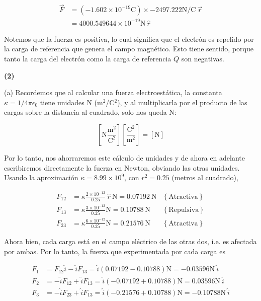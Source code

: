 \documentclass[12pt]{article}
\theoremstyle{definition}
\begin{document}
\begin{align*}
    \vec{F} 
    &= \left( -1.602 \times 10^{-19} \text{C} \right) \times -2497.222
    \text{N/C} ~ \vec{r} \\ 
    &= 4000.549644 \times 10^{-19} \text{N} ~ \hat{r}
\end{align*}

Notemos que la fuerza es positiva, lo cual significa que el electrón es repelido
por la carga de referencia que genera el campo magnético. Esto tiene sentido,
porque tanto la carga del electrón como la carga de referencia $Q$ son negativas.

\pagebreak 

\begin{shaded}
    \textbf{(2)}
\end{shaded}

(a) Recordemos que al calcular una fuerza electroestática, la constanta $\kappa
= 1 / 4\pi \epsilon_0$ tiene unidades N (m$^2$/C$^2$), y al multiplicarla por el
producto de las cargas sobre la distancia al cuadrado, solo nos queda N:

\begin{equation*}
    \left[ \text{N} \frac{\text{m}^2}{\text{C}^2} \right] \left[
    \frac{\text{C}^2}{\text{m}^2} \right] = \left[ \text{N} \right] 
\end{equation*}

Por lo tanto, nos ahorraremos este cálculo de unidades y de ahora en adelante
escribiremos directamente la fuerza en Newton, obviando las otras unidades.
Usando la aproximación $\kappa = 8.99 \times 10^9$, con $r^2 = 0.25$ (metros al
cuadrado), 

\begin{align*}
    F_{12} &= 
    \kappa \frac{ 2 \times 10^{-12}}{0.25} ~ \hat{r}  ~ \text{N} = 0.07192 ~ \text{N}& \left\{
\text{Atractiva} \right\} \\ 
    F_{13} &= \kappa \frac{3 \times 10^{-12} }{0.25} \text{N} = 0.10788  ~ \text{N}&\left\{ \text{Repulsiva} \right\} \\ 
    F_{23} &= \kappa \frac{ 6 \times 10^{-12} }{0.25} \text{N} = 0.21576  ~ \text{N} &\left\{ \text{Atractiva} \right\} 
\end{align*}

Ahora bien, cada carga está en el campo eléctrico de las otras dos, i.e. es
afectada por ambas. Por lo tanto, la fuerza que experimentada por cada carga es 

\begin{align*}
    F_1 &= F_{12}\hat{i} - \hat{i}F_{13} = \hat{i}(0.07192 -
    0.10788)\text{N} = -0.03596\text{N} ~ \hat{i} \\ 
    F_2 &= -\hat{i} F_{12} + \hat{i} F_{13} = \hat{i}(-0.07192 + 0.10788)\text{N}
    = 0.03596\text{N} ~  \hat{i}\\ 
    F_3 &= -\hat{i}F_{23} + \hat{i}F_{13} = \hat{i}(-0.21576 + 0.10788)\text{N}
    = -0.10788\text{N} ~ \hat{i}
\end{align*}
\end{document}
